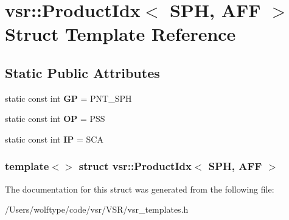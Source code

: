 \hypertarget{structvsr_1_1_product_idx_3_01_s_p_h_00_01_a_f_f_01_4}{\section{vsr\-:\-:Product\-Idx$<$ S\-P\-H, A\-F\-F $>$ Struct Template Reference}
\label{structvsr_1_1_product_idx_3_01_s_p_h_00_01_a_f_f_01_4}
}
\subsection*{Static Public Attributes}
\begin{DoxyCompactItemize}
\item 
\hypertarget{structvsr_1_1_product_idx_3_01_s_p_h_00_01_a_f_f_01_4_aa42d771f9cba6e4270cf21065f6a4541}{static const int {\bfseries G\-P} = P\-N\-T\-\_\-\-S\-P\-H}\label{structvsr_1_1_product_idx_3_01_s_p_h_00_01_a_f_f_01_4_aa42d771f9cba6e4270cf21065f6a4541}

\item 
\hypertarget{structvsr_1_1_product_idx_3_01_s_p_h_00_01_a_f_f_01_4_ac219077117127a2c41cff13644c8b216}{static const int {\bfseries O\-P} = P\-S\-S}\label{structvsr_1_1_product_idx_3_01_s_p_h_00_01_a_f_f_01_4_ac219077117127a2c41cff13644c8b216}

\item 
\hypertarget{structvsr_1_1_product_idx_3_01_s_p_h_00_01_a_f_f_01_4_ab3461703610a91ef3a29b8569ae60d77}{static const int {\bfseries I\-P} = S\-C\-A}\label{structvsr_1_1_product_idx_3_01_s_p_h_00_01_a_f_f_01_4_ab3461703610a91ef3a29b8569ae60d77}

\end{DoxyCompactItemize}
\subsubsection*{template$<$$>$ struct vsr\-::\-Product\-Idx$<$ S\-P\-H, A\-F\-F $>$}



The documentation for this struct was generated from the following file\-:\begin{DoxyCompactItemize}
\item 
/\-Users/wolftype/code/vsr/\-V\-S\-R/vsr\-\_\-templates.\-h\end{DoxyCompactItemize}
